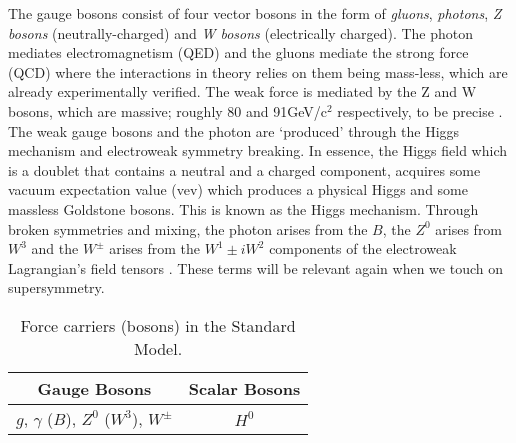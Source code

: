 The gauge bosons consist of four vector bosons in the form of \textit{gluons}, \textit{photons}, \textit{Z bosons} (neutrally-charged) and \textit{W bosons} (electrically charged). The photon mediates electromagnetism (QED) and the gluons mediate the strong force (QCD) where the interactions in theory relies on them being mass-less, which are already experimentally verified. The weak force is mediated by the Z and W bosons, which are massive; roughly 80 and 91GeV/c$^2$ respectively, to be precise \cite{tanabashi2018review}. The weak gauge bosons and the photon are `produced' through the Higgs mechanism and electroweak symmetry breaking. In essence, the Higgs field which is a doublet that contains a neutral and a charged component, acquires some vacuum expectation value (vev) which produces a physical Higgs and some massless Goldstone bosons. This is known as the Higgs mechanism. Through broken symmetries and mixing, the photon arises from the $B$, the $Z^0$ arises from $W^3$ and the $W^\pm$ arises from the $W^1 \pm iW^2$ components of the electroweak Lagrangian's field tensors \cite{thomson2013modern}. These terms will be relevant again when we touch on supersymmetry. \\

\begin{table}[htbp]
    \centering
    \begin{tabular}{||c|c||}
    \hline
       Gauge Bosons  & Scalar Bosons \\
     \hline
       $g$, $\gamma$ ($B$), $Z^0$ ($W^3$), $W^\pm$ & $H^0$ \\
     \hline
    \end{tabular}
    \caption{Force carriers (bosons) in the Standard Model.}
    \label{tab:SMBos}
\end{table}


